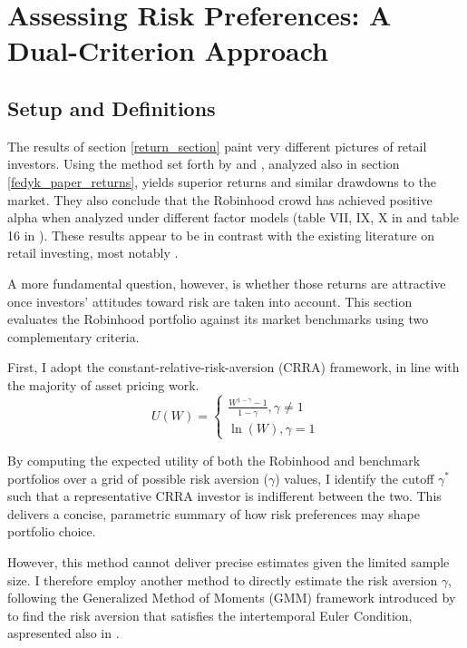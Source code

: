 \section{Assessing Risk Preferences: A Dual-Criterion Approach}
\subsection{Setup and Definitions}
The results of section \ref{return_section} paint very different pictures of retail investors. 
Using the method set forth by \cite{Welch2022} and \cite{Fedyk2024}, analyzed also in section \ref{fedyk_paper_returns}, yields superior returns and similar drawdowns to the market.
They also conclude that the Robinhood crowd has achieved positive alpha when analyzed under different factor models (table VII, IX, X in \cite{Welch2022} and table 16 in \cite{Fedyk2024}). 
These results appear to be in contrast with the existing literature on retail investing, most notably \cite{BarberOdean2000}.

A more fundamental question, however, is whether those returns are attractive once investors' attitudes toward risk are taken into account.
This section evaluates the Robinhood portfolio against its market benchmarks using two complementary criteria.

First, I adopt the constant-relative-risk-aversion (CRRA) framework, in line with the majority of asset pricing work.
\begin{equation}
    U(W) = 
    \begin{cases}
    \frac{W^{1-\gamma}-1}{1-\gamma}, \gamma\neq 1\\
    \ln(W), \gamma = 1
    \end{cases}
    \label{CRRA}
\end{equation}

By computing the expected utility of both the Robinhood and benchmark portfolios over a grid of possible risk aversion ($\gamma$) values,
I identify the cutoff $\gamma^*$ such that a representative CRRA investor is indifferent between the two.
This delivers a concise, parametric summary of how risk preferences may shape portfolio choice.

However, this method cannot deliver precise estimates given the limited sample size. 
I therefore employ another method to directly estimate the risk aversion $\gamma$, 
following the Generalized Method of Moments (GMM) framework introduced by \cite{hansen1982generalized} to find the risk aversion that satisfies the intertemporal Euler Condition, aspresented also in \cite{Cochrane2005}.


